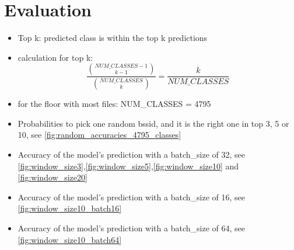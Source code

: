 \chapter{Evaluation}\label{sec:evaluation}



\begin{itemize}
    \item Top k: predicted class is within the top k predictions
    \item calculation for top k: 
      \[\frac{\binom{NUM\_CLASSES - 1}{k - 1}}{\binom{NUM\_CLASSES}{k}} = \frac{k}{NUM\_CLASSES}\]
    \item for the floor with most files: NUM\_CLASSES = 4795
    \item Probabilities to pick one random \ac{bssid}, and it is the right one in top 3, 5 or 10, see \cref{fig:random_accuracies_4795_classes} 
    \item Accuracy of the model's prediction with a batch\_size of 32, see \cref{fig:window_size3},\cref{fig:window_size5},\cref{fig:window_size10} and \cref{fig:window_size20}
    \item Accuracy of the model's prediction with a batch\_size of 16, see \cref{fig:window_size10_batch16}
    \item Accuracy of the model's prediction with a batch\_size of 64, see \cref{fig:window_size10_batch64}
    \end{itemize}


    
